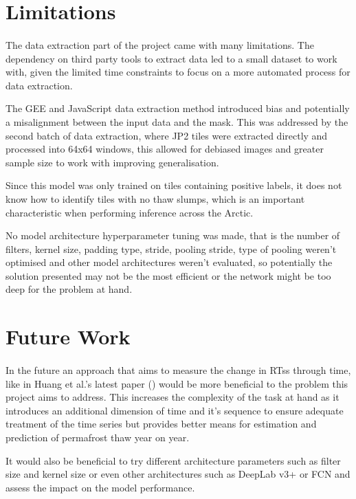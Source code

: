 \section{Limitations}
\paragraph{}
The data extraction part of the project came with many limitations. The dependency on third party tools to extract data led to a small dataset to work with, given the limited time constraints to focus on a more automated process for data extraction.

The GEE and JavaScript data extraction method introduced bias and potentially a misalignment between the input data and the mask.  This was addressed by the second batch of data extraction, where JP2 tiles were extracted directly and processed into 64x64 windows, this allowed for debiased images and  greater sample size to work with improving generalisation.

Since this model was only trained on tiles containing positive labels, it does not know how to identify tiles with no thaw slumps, which is an important characteristic when performing inference across the Arctic. 

No model architecture hyperparameter tuning was made, that is the number of filters, kernel size, padding type, stride, pooling stride, type of pooling weren't optimised and other model architectures weren't evaluated, so potentially the solution presented may not be the most efficient or the network might be too deep for the problem at hand.
\section{Future Work}
\paragraph{}
In the future an approach that aims to measure the change in RTss through time, like in Huang et al.'s latest paper (\cite{HUANG2021102399}) would be more beneficial to the problem this project aims to address. This increases the complexity of the task at hand as it introduces an additional dimension of time and it's sequence to ensure adequate treatment of the time series but provides better means for estimation and prediction of permafrost thaw year on year.

It would also be beneficial to try different architecture parameters such as filter size and kernel size or even other architectures such as DeepLab v3+ or \gls{FCN} and assess the impact on the model performance.

